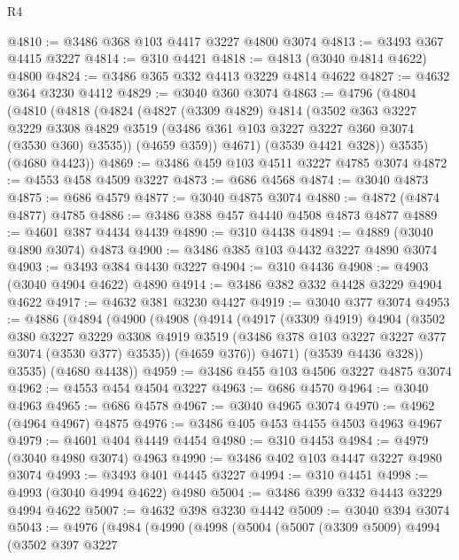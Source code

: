 \begin{lexlean}{R4}
\begin{coremodule}
@4810 := @3486 @368 @103 @4417 @3227 @4800 @3074
@4813 := @3493 @367 @4415 @3227
@4814 := @310 @4421
@4818 := @4813 (@3040 @4814 @4622) @4800
@4824 := @3486 @365 @332 @4413 @3229 @4814 @4622
@4827 := @4632 @364 @3230 @4412
@4829 := @3040 @360 @3074
@4863 := @4796
    (@4804
      (@4810
        (@4818
          (@4824
            (@4827
              (@3309 @4829)
              @4814
              (@3502
                @363
                @3227
                @3229
                @3308
                @4829
                @3519
                (@3486 @361 @103 @3227 @3227 @360 @3074 (@3530 @360) @3535))
              (@4659 @359))
            @4671)
          (@3539 @4421 @328))
        @3535)
      (@4680 @4423))
@4869 := @3486 @459 @103 @4511 @3227 @4785 @3074
@4872 := @4553 @458 @4509 @3227
@4873 := @686 @4568
@4874 := @3040 @4873
@4875 := @686 @4579
@4877 := @3040 @4875 @3074
@4880 := @4872 (@4874 @4877) @4785
@4886 := @3486 @388 @457 @4440 @4508 @4873 @4877
@4889 := @4601 @387 @4434 @4439
@4890 := @310 @4438
@4894 := @4889 (@3040 @4890 @3074) @4873
@4900 := @3486 @385 @103 @4432 @3227 @4890 @3074
@4903 := @3493 @384 @4430 @3227
@4904 := @310 @4436
@4908 := @4903 (@3040 @4904 @4622) @4890
@4914 := @3486 @382 @332 @4428 @3229 @4904 @4622
@4917 := @4632 @381 @3230 @4427
@4919 := @3040 @377 @3074
@4953 := @4886
    (@4894
      (@4900
        (@4908
          (@4914
            (@4917
              (@3309 @4919)
              @4904
              (@3502
                @380
                @3227
                @3229
                @3308
                @4919
                @3519
                (@3486 @378 @103 @3227 @3227 @377 @3074 (@3530 @377) @3535))
              (@4659 @376))
            @4671)
          (@3539 @4436 @328))
        @3535)
      (@4680 @4438))
@4959 := @3486 @455 @103 @4506 @3227 @4875 @3074
@4962 := @4553 @454 @4504 @3227
@4963 := @686 @4570
@4964 := @3040 @4963
@4965 := @686 @4578
@4967 := @3040 @4965 @3074
@4970 := @4962 (@4964 @4967) @4875
@4976 := @3486 @405 @453 @4455 @4503 @4963 @4967
@4979 := @4601 @404 @4449 @4454
@4980 := @310 @4453
@4984 := @4979 (@3040 @4980 @3074) @4963
@4990 := @3486 @402 @103 @4447 @3227 @4980 @3074
@4993 := @3493 @401 @4445 @3227
@4994 := @310 @4451
@4998 := @4993 (@3040 @4994 @4622) @4980
@5004 := @3486 @399 @332 @4443 @3229 @4994 @4622
@5007 := @4632 @398 @3230 @4442
@5009 := @3040 @394 @3074
@5043 := @4976
    (@4984
      (@4990
        (@4998
          (@5004
            (@5007
              (@3309 @5009)
              @4994
              (@3502
                @397
                @3227

\end{coremodule}
\end{lexlean}
